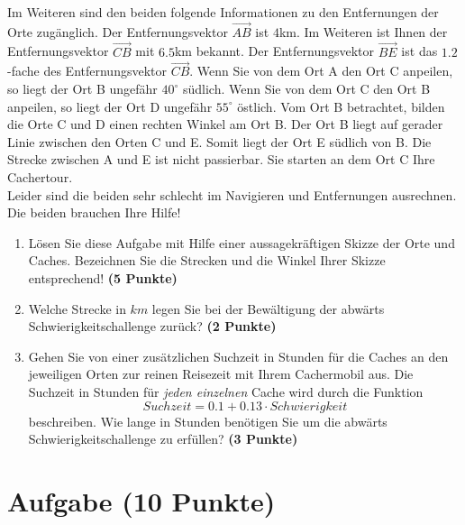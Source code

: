 \documentclass[a4paper, 9pt]{scrartcl}\usepackage[]{graphicx}\usepackage[]{xcolor}
\begin{document}
Im Weiteren sind den beiden folgende Informationen zu den Entfernungen der Orte zugänglich. Der Entfernungsvektor $\overrightarrow{AB}$ ist $4$km. Im Weiteren ist Ihnen der Entfernungsvektor $\overrightarrow{CB}$ mit $6.5$km bekannt. Der Entfernungsvektor $\overrightarrow{BE}$ ist das $1.2$-fache des Entfernungsvektor $\overrightarrow{CB}$. Wenn Sie von dem Ort A den Ort C anpeilen, so liegt der Ort B ungefähr $40^\circ$ südlich. Wenn Sie von dem Ort C den Ort B anpeilen, so liegt der Ort D ungefähr $55^\circ$ östlich. Vom Ort B betrachtet, bilden die Orte C und D einen rechten Winkel am Ort B. Der Ort B liegt auf gerader Linie zwischen den Orten C und E. Somit liegt der Ort E südlich von B. Die Strecke zwischen A und E ist nicht passierbar. Sie starten an dem Ort C Ihre Cachertour. \\

Leider sind die beiden sehr schlecht im Navigieren und Entfernungen ausrechnen. Die beiden brauchen Ihre Hilfe!
  
\begin{enumerate}
\item Lösen Sie diese Aufgabe mit Hilfe einer aussagekräftigen Skizze der Orte und Caches. Bezeichnen Sie die Strecken und die Winkel Ihrer Skizze entsprechend! \textbf{(5 Punkte)}
\item Welche Strecke in $km$ legen Sie bei der Bewältigung der abwärts Schwierigkeitschallenge zurück? \textbf{(2 Punkte)}
\item Gehen Sie von einer zusätzlichen Suchzeit in Stunden für die Caches an den jeweiligen Orten zur reinen Reisezeit mit Ihrem Cachermobil aus. Die Suchzeit in Stunden für \textit{jeden einzelnen} Cache wird durch die Funktion  
  \begin{equation*}
    Suchzeit = 0.1 + 0.13 \cdot Schwierigkeit
  \end{equation*}  
  beschreiben.  Wie lange in Stunden benötigen Sie um die abwärts Schwierigkeitschallenge zu erfüllen? \textbf{(3 Punkte)}
\end{enumerate}

 
\clearpage

\section{Aufgabe \hfill (10 Punkte)}
\end{document}

